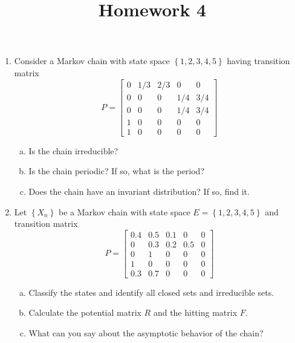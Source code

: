 \documentclass{article}
\begin{document}
\title{Homework 4}
\maketitle
\thispagestyle{fancy}

\begin{enumerate}
	\item Consider a Markov chain with state space $\left\{ 1, 2, 3, 4, 5 \right\}$ having transition matrix
		\[P=\begin{bmatrix}
				0 & 1/3 & 2/3 & 0 & 0 \\
				0 & 0 & 0 & 1/4 & 3/4 \\
				0 & 0 & 0 & 1/4 & 3/4 \\
				1 & 0 & 0 & 0 & 0 \\
				1 & 0 & 0 & 0 & 0
		\end{bmatrix}\]

		\begin{enumerate}[(a)]
			\item Is the chain irreducible?

			\item Is the chain periodic? If so, what is the period?

			\item Does the chain have an invariant distribution? If so, find it.
				
		\end{enumerate}

	\item Let $\left\{ X_n \right\}$ be a Markov chain with state space $E=\left\{ 1, 2, 3, 4, 5 \right\}$ and transition matrix
		\[P=\begin{bmatrix}
				0.4 & 0.5 & 0.1 & 0 & 0 \\
				0 & 0.3 & 0.2 & 0.5 & 0 \\
				0 & 1 & 0 & 0 & 0 \\
				1 & 0 & 0 & 0 & 0 \\
				0.3 & 0.7 & 0 & 0 & 0
		\end{bmatrix}\]

		\begin{enumerate}[(a)]
			\item Classify the states and identify all closed sets and irreducible sets.

			\item Calculate the potential matrix $R$ and the hitting matrix $F.$

			\item What can you say about the asymptotic behavior of the chain?
				

\end{enumerate}
\end{enumerate}
\end{document}
